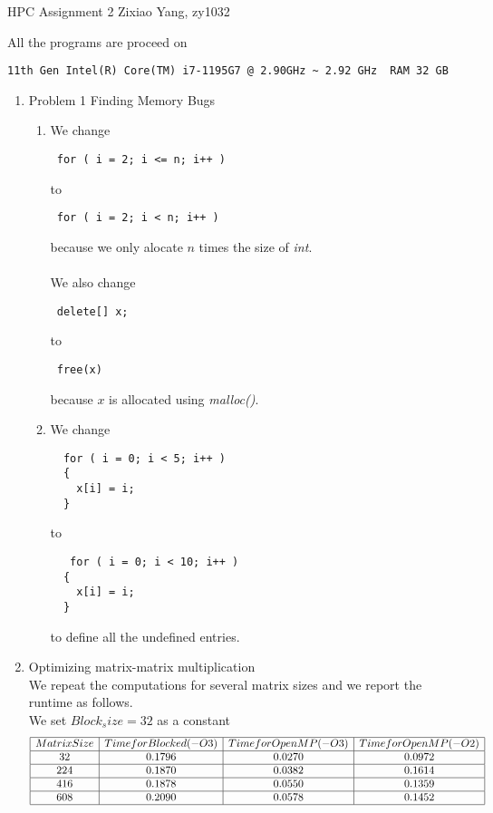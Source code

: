 \documentclass{article}
\begin{document}
{ \centerline{\large HPC Assignment 2 \quad Zixiao Yang, zy1032}}
\vskip0.25cm
\vskip0.25cm

All the programs are proceed on \begin{verbatim}11th Gen Intel(R) Core(TM) i7-1195G7 @ 2.90GHz ~ 2.92 GHz  RAM 32 GB \end{verbatim}
\begin{enumerate}
\item Problem 1 Finding Memory Bugs
\begin{enumerate}
\item We change \begin{verbatim} for ( i = 2; i <= n; i++ ) \end{verbatim} to \begin{verbatim} for ( i = 2; i < n; i++ ) \end{verbatim}
because we only alocate $n$ times the size of \emph{int}.
\\ \\
We also change \begin{verbatim} delete[] x; \end{verbatim} to \begin{verbatim} free(x) \end{verbatim}
because $x$ is allocated using \emph{malloc()}.
\item 
We change \begin{verbatim}  for ( i = 0; i < 5; i++ )
  {
    x[i] = i;
  } \end{verbatim} to \begin{verbatim}   for ( i = 0; i < 10; i++ )
  {
    x[i] = i;
  } \end{verbatim}
to define all the undefined entries.
\end{enumerate}
\item Optimizing matrix-matrix multiplication
\\
We repeat the computations for several matrix sizes and we report the runtime as follows.
\\
We set $Block_size=32$ as a constant
\[
\begin{array}{|c|c|c|c|c|}
\hline
 Matrix Size & Time for Blocked (-O3 )& Time for OpenMP (-O3) &Time for OpenMP(-O2)\\
\hline
32 & 0.1796 & 0.0270  & 0.0972\\ \hline
224 & 0.1870  & 0.0382&0.1614\\ \hline
416 & 0.1878 &0.0550 &0.1359\\ \hline
608 & 0.2090 & 0.0578 &0.1452\\ \hline

\end{array}\]
\end{enumerate}
\end{document}
